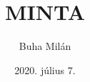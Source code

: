 \documentclass{book}
\begin{document}
\begin{titlepage}

\title{\textsc{MINTA}}
\author{Buha Milán}
\date{2020. július 7.}
\maketitle

\end{titlepage}
\end{document}
